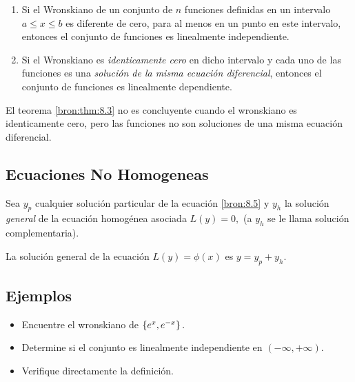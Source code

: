 	\begin{teorema}
		\label{bron:thm:8.3}
		\begin{enumerate}
			\item   Si el Wronskiano de un conjunto de $n$ funciones definidas en un intervalo $a \leq x \leq b$ es diferente de cero, para al menos en un punto en este intervalo, entonces el conjunto de funciones es linealmente independiente.			
			\item
			Si el Wronskiano es \emph{identicamente cero} en dicho intervalo y cada uno de las funciones es una \emph{soluci\'on de la misma ecuaci\'on diferencial}, entonces el conjunto de funciones es linealmente dependiente.
		\end{enumerate}
	\end{teorema}
	



	\begin{observacion}
		El teorema \ref{bron:thm:8.3} no es concluyente cuando el wronskiano es identicamente cero, pero las funciones no son soluciones de una misma ecuaci\'on diferencial.
	\end{observacion}
	


\subsection{Ecuaciones No Homogeneas}


	Sea $y_{p}$ cualquier soluci\'on particular de la ecuaci\'on \eqref{bron:8.5} y $y_{h}$ la soluci\'on \emph{general} de la ecuaci\'on homog\'enea asociada $L(y)=0,$ (a $y_{h}$ se le llama soluci\'on complementaria).


	\begin{teorema}
		\label{bron:thm:8.4}
		La soluci\'on general de la ecuaci\'on $L(y)=\phi(x)$ es $y=y_{p}+y_{h}.$
	\end{teorema}
	


\subsection{Ejemplos}


	\begin{problema}
		\begin{itemize}
			\item Encuentre el wronskiano de $\left\{ e^{x},e^{-x} \right\}.$
			
			\item Determine si el conjunto es linealmente independiente en $(-\infty,+\infty).$
			
			\item Verifique directamente la definición.
		\end{itemize}
		
	\end{problema}
	



